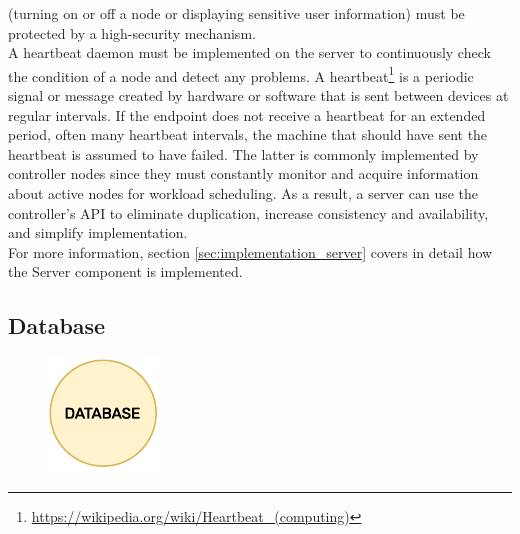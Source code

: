 (turning on or off a node or displaying sensitive user information) must be protected
by a high-security mechanism. \\ %
A heartbeat daemon must be implemented on the server to continuously check the condition
of a node and detect any problems. A heartbeat\footnote{\url{https://wikipedia.org/wiki/Heartbeat_(computing)}}
is a periodic signal or message created by hardware or software that is sent
between devices at regular intervals. If the endpoint does not receive a heartbeat
for an extended period, often many heartbeat intervals, the machine that should have
sent the heartbeat is assumed to have failed. The latter is commonly implemented
by controller nodes since they must constantly monitor and acquire information
about active nodes for workload scheduling. As a result, a server can use the
controller's API to eliminate duplication, increase consistency and availability,
and simplify implementation. \\ %
For more information, section \ref{sec:implementation_server} covers in detail how
the Server component is implemented.

\subsection{Database}
\label{subsec:architecture_components_database}

\begin{figure}
  \centering
  \includegraphics[width=\linewidth]{images/architecture/database.pdf}
\end{figure}


